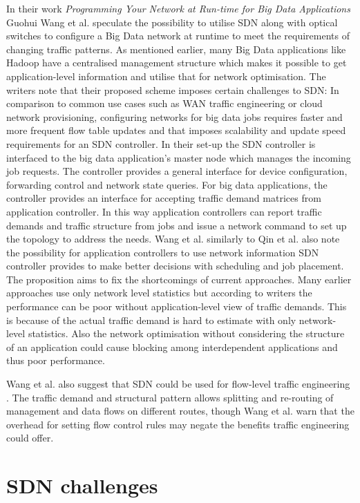\documentclass{acm_proc_article-sp}
\begin{document}
In their work \textit{Programming Your Network at Run-time for Big Data Applications} \cite{Wang:2012:PYN:2342441.2342462} Guohui Wang et al. speculate the possibility to utilise SDN along with optical switches to configure a Big Data network at runtime to meet the requirements of changing traffic patterns. As mentioned earlier, many Big Data applications like Hadoop have a centralised management structure which makes it possible to get application-level information and utilise that for network optimisation. The writers note that their proposed scheme imposes certain challenges to SDN: In comparison to common use cases such as WAN traffic engineering or cloud network provisioning, configuring networks for big data jobs requires faster and more frequent flow table updates and that imposes scalability and update speed requirements for an SDN controller. In their set-up the SDN controller is interfaced to the big data application's master node which manages the incoming job requests. The controller provides a general interface for device configuration, forwarding control and network state queries. For big data applications, the controller provides an interface for accepting traffic demand matrices from application controller. In this way application controllers can report traffic demands and traffic structure from jobs and issue a network command to set up the topology to address the needs. Wang et al. similarly to Qin et al.\cite{Scheduling} also note the possibility for application controllers to use network information SDN controller provides to make better decisions  with scheduling and job placement. The proposition aims to fix the shortcomings of current approaches. Many earlier approaches use only network level statistics but according to writers the performance can be poor without application-level view of traffic demands. This is because of the actual traffic demand is hard to estimate with only network-level statistics. Also the network optimisation without considering the structure of an application could cause blocking among interdependent applications and thus poor performance. 

Wang et al. also suggest that SDN could be used for flow-level traffic engineering \cite{Wang:2012:PYN:2342441.2342462}. The traffic demand and structural pattern  allows splitting and re-routing of management and data flows on different routes, though Wang et al. warn that the overhead for setting flow control rules may negate the benefits traffic engineering could offer.

\section{SDN challenges}
\end{document}
